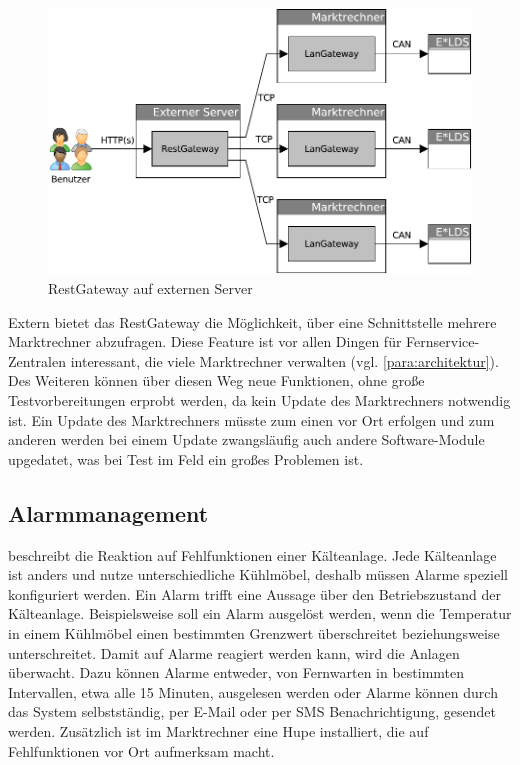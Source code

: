 \documentclass[11pt,a4paper]{report}
\begin{document}
\begin{figure}[htbp]
\centering
\includegraphics[scale=0.7]{images/RestGateway_extern.pdf}
\caption[]{RestGateway auf externen Server}
\label{fig:rest_extern}
\end{figure}

Extern bietet das RestGateway die Möglichkeit, über eine Schnittstelle mehrere Marktrechner abzufragen. Diese Feature ist vor allen Dingen für Fernservice-Zentralen interessant, die viele Marktrechner verwalten (vgl. \ref{para:architektur}). Des Weiteren können über diesen Weg neue Funktionen, ohne große Testvorbereitungen erprobt werden, da kein Update des Marktrechners notwendig ist. Ein Update des Marktrechners müsste zum einen vor Ort erfolgen und zum anderen werden bei einem Update zwangsläufig auch andere Software-Module upgedatet, was bei Test im Feld ein großes Problemen ist.

\subsection{Alarmmanagement} beschreibt die Reaktion auf Fehlfunktionen einer Kälteanlage. Jede Kälteanlage ist anders und nutze unterschiedliche Kühlmöbel, deshalb müssen Alarme speziell konfiguriert werden. Ein Alarm trifft eine Aussage über den Betriebszustand der Kälteanlage. Beispielsweise soll ein Alarm ausgelöst werden, wenn die Temperatur in einem Kühlmöbel einen bestimmten Grenzwert überschreitet beziehungsweise unterschreitet. Damit auf Alarme reagiert werden kann, wird die Anlagen überwacht. Dazu können Alarme entweder, von Fernwarten in bestimmten Intervallen, etwa alle 15 Minuten, ausgelesen werden oder Alarme können durch das System selbstständig, per E-Mail oder per SMS Benachrichtigung, gesendet werden. Zusätzlich ist im Marktrechner eine Hupe installiert, die auf Fehlfunktionen vor Ort aufmerksam macht. 
\end{document}
